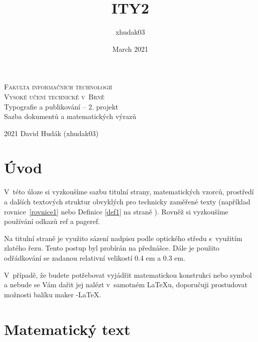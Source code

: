 \documentclass[11pt, a4paper, twocolumn]{article}
\title{ITY2}
\author{xhudak03}
\date{March 2021}
\theoremstyle{definition}
\begin{document}
\begin{titlepage}
\begin{center}
{\Huge
\textsc{Fakulta informačních technologií\\[0.4em]Vysoké učení technické v~Brně}}\\
\LARGE
Typografie a publikování -- 2. projekt\\[0.3em]Sazba dokumentů a matematických výrazů
\end{center}
{\LARGE 2021 \hfill
David Hudák (xhudak03)}
\thispagestyle{empty}
\end{titlepage}

\clearpage
{} 

\section*{Úvod}

V~této úloze si vyzkoušíme sazbu titulní strany, matematických vzorců, prostředí a dalších textových struktur obvyklých pro technicky zaměřené texty (například rovnice~\eqref{rovnice1}
nebo Definice \ref{def1} na straně \pageref{rovnice}). Rovněž si vyzkoušíme používání odkazů {\selectfont {}ref} a
{\selectfont {}pageref}.

Na titulní straně je využito sázení nadpisu podle optického středu s~využitím zlatého řezu. Tento postup byl
probírán na přednášce. Dále je použito odřádkování se
zadanou relativní velikostí 0.4 em a 0.3 em.

V~případě, že budete potřebovat vyjádřit matematickou
konstrukci nebo symbol a nebude se Vám dařit jej nalézt
v~samotném \LaTeX u, doporučuji prostudovat možnosti balíku maker \AmS -\LaTeX.

\section{Matematický text}
\end{document}
